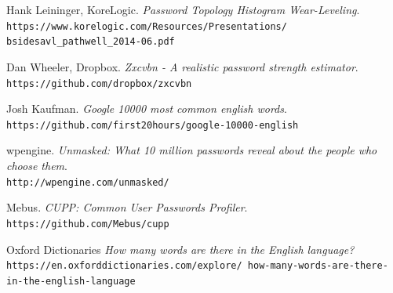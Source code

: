 \documentclass[11pt, a4paper]{article}
\begin{document}
\begin{thebibliography}{99}
Hank Leininger, KoreLogic.
\textit{Password Topology Histogram Wear-Leveling}.
\\\texttt{https://www.korelogic.com/Resources/Presentations/
bsidesavl\_pathwell\_2014-06.pdf}

Dan Wheeler, Dropbox.
\textit{Zxcvbn - A realistic password strength estimator}.
\\\texttt{https://github.com/dropbox/zxcvbn}

Josh Kaufman.
\textit{Google 10000 most common english words}.
\\\texttt{https://github.com/first20hours/google-10000-english}

wpengine.
\textit{Unmasked: What 10 million passwords reveal about the people who choose them}.
\\\texttt{http://wpengine.com/unmasked/}

Mebus.
\textit{CUPP: Common User Passwords Profiler}.
\\\texttt{https://github.com/Mebus/cupp}

Oxford Dictionaries
\textit{How many words are there in the English language?}
\\\texttt{https://en.oxforddictionaries.com/explore/
how-many-words-are-there-in-the-english-language}


\end{thebibliography}
\end{document}
